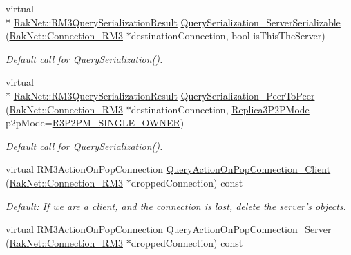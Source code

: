 \begin{DoxyCompactItemize}
virtual \\*
\hyperlink{group___r_e_p_l_i_c_a___m_a_n_a_g_e_r___g_r_o_u_p3_ga9a29b413d7f2b9cb21c16457631d3aef}{Rak\-Net\-::\-R\-M3\-Query\-Serialization\-Result} \hyperlink{class_rak_net_1_1_replica3_a2a2c5faec10124231298d43e6f628234}{Query\-Serialization\-\_\-\-Server\-Serializable} (\hyperlink{class_rak_net_1_1_connection___r_m3}{Rak\-Net\-::\-Connection\-\_\-\-R\-M3} $\ast$destination\-Connection, bool is\-This\-The\-Server)
\begin{DoxyCompactList}\small\item\em Default call for \hyperlink{class_rak_net_1_1_replica3_abc1b2daa5c1a908ddd2d6df44da7e9aa}{Query\-Serialization()}. \end{DoxyCompactList}\item 
virtual \\*
\hyperlink{group___r_e_p_l_i_c_a___m_a_n_a_g_e_r___g_r_o_u_p3_ga9a29b413d7f2b9cb21c16457631d3aef}{Rak\-Net\-::\-R\-M3\-Query\-Serialization\-Result} \hyperlink{class_rak_net_1_1_replica3_a212c9fff207005acf494fb9c4ae9e194}{Query\-Serialization\-\_\-\-Peer\-To\-Peer} (\hyperlink{class_rak_net_1_1_connection___r_m3}{Rak\-Net\-::\-Connection\-\_\-\-R\-M3} $\ast$destination\-Connection, \hyperlink{group___r_e_p_l_i_c_a___m_a_n_a_g_e_r___g_r_o_u_p3_ga91a588da9d58bc86b8fb7e4f27ddcf7e}{Replica3\-P2\-P\-Mode} p2p\-Mode=\hyperlink{group___r_e_p_l_i_c_a___m_a_n_a_g_e_r___g_r_o_u_p3_gga91a588da9d58bc86b8fb7e4f27ddcf7eae6bb229afa26313b6aa4c11320e630d5}{R3\-P2\-P\-M\-\_\-\-S\-I\-N\-G\-L\-E\-\_\-\-O\-W\-N\-E\-R})
\begin{DoxyCompactList}\small\item\em Default call for \hyperlink{class_rak_net_1_1_replica3_abc1b2daa5c1a908ddd2d6df44da7e9aa}{Query\-Serialization()}. \end{DoxyCompactList}\item 
\hypertarget{class_rak_net_1_1_replica3_a4e6de7837b8df78d6932691df18d2111}{virtual R\-M3\-Action\-On\-Pop\-Connection \hyperlink{class_rak_net_1_1_replica3_a4e6de7837b8df78d6932691df18d2111}{Query\-Action\-On\-Pop\-Connection\-\_\-\-Client} (\hyperlink{class_rak_net_1_1_connection___r_m3}{Rak\-Net\-::\-Connection\-\_\-\-R\-M3} $\ast$dropped\-Connection) const }\label{class_rak_net_1_1_replica3_a4e6de7837b8df78d6932691df18d2111}

\begin{DoxyCompactList}\small\item\em Default\-: If we are a client, and the connection is lost, delete the server's objects. \end{DoxyCompactList}\item 
\hypertarget{class_rak_net_1_1_replica3_ae9f27d603e6e5848fc2b6406319a2307}{virtual R\-M3\-Action\-On\-Pop\-Connection \hyperlink{class_rak_net_1_1_replica3_ae9f27d603e6e5848fc2b6406319a2307}{Query\-Action\-On\-Pop\-Connection\-\_\-\-Server} (\hyperlink{class_rak_net_1_1_connection___r_m3}{Rak\-Net\-::\-Connection\-\_\-\-R\-M3} $\ast$dropped\-Connection) const }\label{class_rak_net_1_1_replica3_ae9f27d603e6e5848fc2b6406319a2307}


\end{DoxyCompactItemize}
